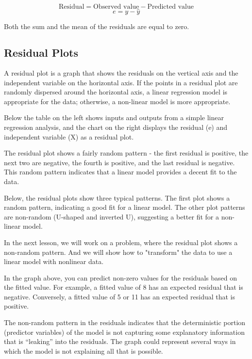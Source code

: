 \documentclass[main.tex]{subfiles}
\begin{document}
\[\mbox{Residual} = \mbox{Observed value} - \mbox{Predicted value}\] 
\[e = y - \hat{y}\]

Both the sum and the mean of the residuals are equal to zero. 

\subsection{Residual Plots}
A residual plot is a graph that shows the residuals on the vertical axis and the independent variable on the horizontal axis. If the points in a residual plot are randomly dispersed around the horizontal axis, a linear regression model is appropriate for the data; otherwise, a non-linear model is more appropriate.

Below the table on the left shows inputs and outputs from a simple linear regression analysis, and the chart on the right displays the residual (e) and independent variable (X) as a residual plot.

\newpage
The residual plot shows a fairly random pattern - the first residual is positive, the next two are negative, the fourth is positive, and the last residual is negative. This random pattern indicates that a linear model provides a decent fit to the data.

Below, the residual plots show three typical patterns. The first plot shows a random pattern, indicating a good fit for a linear model. The other plot patterns are non-random (U-shaped and inverted U), suggesting a better fit for a non-linear model.

		
In the next lesson, we will work on a problem, where the residual plot shows a non-random pattern. And we will show how to "transform" the data to use a linear model with nonlinear data.

\newpage
In the graph above, you can predict non-zero values for the residuals based on the fitted value. For example, a fitted value of 8 has an expected residual that is negative. Conversely, a fitted value of 5 or 11 has an expected residual that is positive.

The non-random pattern in the residuals indicates that the deterministic portion (predictor variables) of the model is not capturing some explanatory information that is “leaking” into the residuals. The graph could represent several ways in which the model is not explaining all that is possible. 
\end{document}
